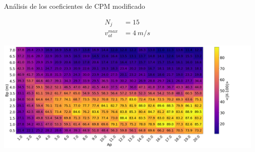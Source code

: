 \begin{frame}{Análisis de los coeficientes de CPM modificado}
    \begin{center}
        \begin{minipage}[c]{0.15\textwidth}
            \begin{equation*}
                \begin{aligned}
                    N_j &= 15 \\
                    v_{at}^{max} &= 4\ m/s
                \end{aligned}
            \end{equation*}
        \end{minipage}
        \hfill
        \begin{minipage}[c]{0.80\textwidth}
            \includegraphics[width=1.1\textwidth]{pic/05-resultados/r1}
        \end{minipage}
    \end{center}
    \vfill
    \footnotesize{}
\end{frame}

